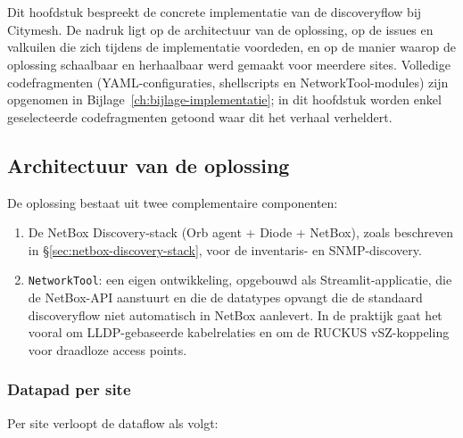 
\chapter{}%
\label{ch:implementatie}

Dit hoofdstuk bespreekt de concrete implementatie van de discoveryflow bij Citymesh. De nadruk ligt op de architectuur van de oplossing, op de issues en valkuilen die zich tijdens de implementatie voordeden, en op de manier waarop de oplossing schaalbaar en herhaalbaar werd gemaakt voor meerdere sites. Volledige codefragmenten (YAML-configuraties, shellscripts en NetworkTool-modules) zijn opgenomen in Bijlage~\ref{ch:bijlage-implementatie}; in dit hoofdstuk worden enkel geselecteerde codefragmenten getoond waar dit het verhaal verheldert.

\section{Architectuur van de oplossing}
\label{sec:architectuur}

De oplossing bestaat uit twee complementaire componenten:

\begin{enumerate}
  \item De NetBox Discovery-stack (Orb agent + Diode + NetBox), zoals beschreven in \S\ref{sec:netbox-discovery-stack}, voor de inventaris- en SNMP-discovery.
  \item \texttt{NetworkTool}: een eigen ontwikkeling, opgebouwd als Streamlit-applicatie\autocite{Streamlit}, die de NetBox-API aanstuurt en die de datatypes opvangt die de standaard discoveryflow niet automatisch in NetBox aanlevert. In de praktijk gaat het vooral om LLDP-gebaseerde kabelrelaties en om de RUCKUS vSZ-koppeling voor draadloze access points\autocite{RuckusVSZ}.
\end{enumerate}

\subsection{Datapad per site}

Per site verloopt de dataflow als volgt:

